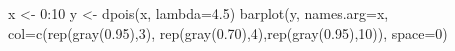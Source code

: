 \begin{Schunk}
\begin{Sinput}
 x <- 0:10
 y <- dpois(x, lambda=4.5)
 barplot(y, names.arg=x, col=c(rep(gray(0.95),3), rep(gray(0.70),4),rep(gray(0.95),10)), space=0)
\end{Sinput}
\end{Schunk}
